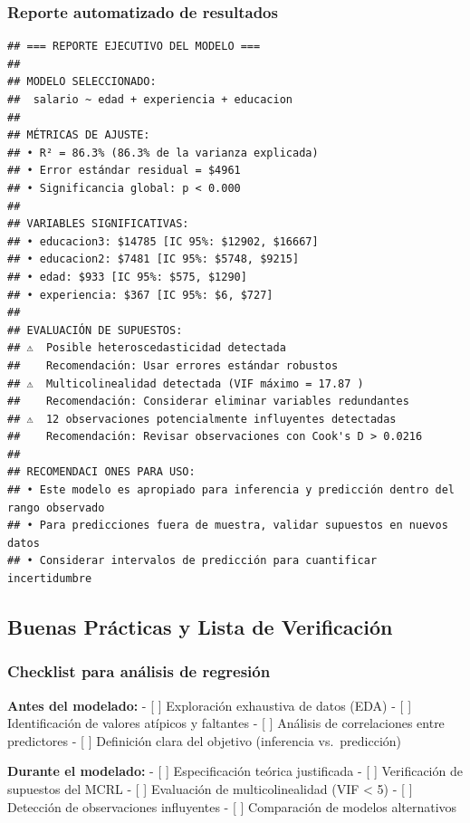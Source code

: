 \documentclass[
  oneside]{book}
\begin{document}
\subsubsection{Reporte automatizado de resultados}\label{reporte-automatizado-de-resultados}

\begin{verbatim}
## === REPORTE EJECUTIVO DEL MODELO ===
## 
## MODELO SELECCIONADO:
##  salario ~ edad + experiencia + educacion 
## 
## MÉTRICAS DE AJUSTE:
## • R² = 86.3% (86.3% de la varianza explicada)
## • Error estándar residual = $4961
## • Significancia global: p < 0.000
## 
## VARIABLES SIGNIFICATIVAS:
## • educacion3: $14785 [IC 95%: $12902, $16667]
## • educacion2: $7481 [IC 95%: $5748, $9215]
## • edad: $933 [IC 95%: $575, $1290]
## • experiencia: $367 [IC 95%: $6, $727]
## 
## EVALUACIÓN DE SUPUESTOS:
## ⚠️  Posible heteroscedasticidad detectada
##    Recomendación: Usar errores estándar robustos
## ⚠️  Multicolinealidad detectada (VIF máximo = 17.87 )
##    Recomendación: Considerar eliminar variables redundantes
## ⚠️  12 observaciones potencialmente influyentes detectadas
##    Recomendación: Revisar observaciones con Cook's D > 0.0216 
## 
## RECOMENDACI ONES PARA USO:
## • Este modelo es apropiado para inferencia y predicción dentro del rango observado
## • Para predicciones fuera de muestra, validar supuestos en nuevos datos
## • Considerar intervalos de predicción para cuantificar incertidumbre
\end{verbatim}

\subsection{Buenas Prácticas y Lista de Verificación}\label{buenas-pruxe1cticas-y-lista-de-verificaciuxf3n}

\subsubsection{Checklist para análisis de regresión}\label{checklist-para-anuxe1lisis-de-regresiuxf3n}

\textbf{Antes del modelado:}
- {[} {]} Exploración exhaustiva de datos (EDA)
- {[} {]} Identificación de valores atípicos y faltantes
- {[} {]} Análisis de correlaciones entre predictores
- {[} {]} Definición clara del objetivo (inferencia vs.~predicción)

\textbf{Durante el modelado:}
- {[} {]} Especificación teórica justificada
- {[} {]} Verificación de supuestos del MCRL
- {[} {]} Evaluación de multicolinealidad (VIF \textless{} 5)
- {[} {]} Detección de observaciones influyentes
- {[} {]} Comparación de modelos alternativos
\end{document}
